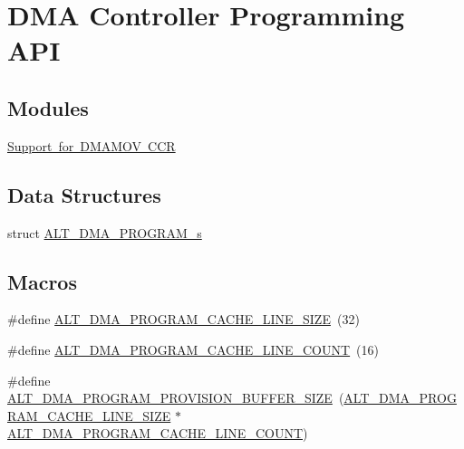 \hypertarget{group__ALT__DMA__PRG}{}\section{D\+MA Controller Programming A\+PI}
\label{group__ALT__DMA__PRG}
\subsection*{Modules}
\begin{DoxyCompactItemize}
\item 
\mbox{\hyperlink{group__DMA__CCR}{Support for D\+M\+A\+M\+O\+V C\+CR}}
\end{DoxyCompactItemize}
\subsection*{Data Structures}
\begin{DoxyCompactItemize}
\item 
struct \mbox{\hyperlink{structALT__DMA__PROGRAM__s}{A\+L\+T\+\_\+\+D\+M\+A\+\_\+\+P\+R\+O\+G\+R\+A\+M\+\_\+s}}
\end{DoxyCompactItemize}
\subsection*{Macros}
\begin{DoxyCompactItemize}
\item 
\#define \mbox{\hyperlink{group__ALT__DMA__PRG_gae9006d74c88b55b9b19e8b51882dc345}{A\+L\+T\+\_\+\+D\+M\+A\+\_\+\+P\+R\+O\+G\+R\+A\+M\+\_\+\+C\+A\+C\+H\+E\+\_\+\+L\+I\+N\+E\+\_\+\+S\+I\+ZE}}~(32)
\item 
\#define \mbox{\hyperlink{group__ALT__DMA__PRG_gab1f145c6cd73c64707ef47ba15550b3b}{A\+L\+T\+\_\+\+D\+M\+A\+\_\+\+P\+R\+O\+G\+R\+A\+M\+\_\+\+C\+A\+C\+H\+E\+\_\+\+L\+I\+N\+E\+\_\+\+C\+O\+U\+NT}}~(16)
\item 
\#define \mbox{\hyperlink{group__ALT__DMA__PRG_gad2247d4b56108fe0ab3690c2bc1b6d08}{A\+L\+T\+\_\+\+D\+M\+A\+\_\+\+P\+R\+O\+G\+R\+A\+M\+\_\+\+P\+R\+O\+V\+I\+S\+I\+O\+N\+\_\+\+B\+U\+F\+F\+E\+R\+\_\+\+S\+I\+ZE}}~(\mbox{\hyperlink{group__ALT__DMA__PRG_gae9006d74c88b55b9b19e8b51882dc345}{A\+L\+T\+\_\+\+D\+M\+A\+\_\+\+P\+R\+O\+G\+R\+A\+M\+\_\+\+C\+A\+C\+H\+E\+\_\+\+L\+I\+N\+E\+\_\+\+S\+I\+ZE}} $\ast$ \mbox{\hyperlink{group__ALT__DMA__PRG_gab1f145c6cd73c64707ef47ba15550b3b}{A\+L\+T\+\_\+\+D\+M\+A\+\_\+\+P\+R\+O\+G\+R\+A\+M\+\_\+\+C\+A\+C\+H\+E\+\_\+\+L\+I\+N\+E\+\_\+\+C\+O\+U\+NT}})
\end{DoxyCompactItemize}
